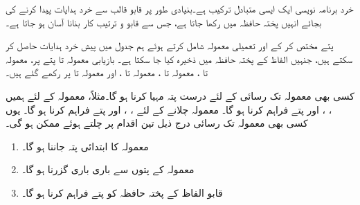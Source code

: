 خرد برنامہ نویسی ایک ایسی  متبادل ترکیب ہے۔بنیادی طور پر  قابو قالب سے خرد ہدایات پیدا کرنے کی بجائے انہیں پختہ حافظہ میں رکھا جاتا ہے، جس  سے  قابو و ترتیب کار بنانا   آسان ہو جاتا ہے۔

پتے مختص کر کے  اور تعمیلی معمولہ شامل کرتے ہوئے ہم جدول  میں پیش خرد ہدایات حاصل کر سکتے ہیں، جنہیں  الفاظ کے پختہ حافظہ میں ذخیرہ کیا جا سکتا ہے۔  بازیابی  معمولہ   تا  پتے پر،  معمولہ  تا ،  معمولہ  تا ،  معمولہ  تا ، اور    معمولہ  تا  پر رکھے گئے ہیں۔

کسی بھی معمولہ تک رسائی کے لئے  درست پتہ  مہیا کرنا ہو گا۔مثلاً،  معمولہ   کے لئے ہمیں ، ، اور  پتے فراہم کرنا ہو گا۔  معمولہ چلانے کے لئے ، ، اور  پتے فراہم کرنا ہو گا۔ یوں کسی بھی معمولہ تک رسائی درج ذیل تین اقدام پر چلتے ہوئے ممکن ہو گی۔
\begin{enumerate}[1.]
\item
معمولہ کا ابتدائی پتہ  جاننا ہو گا۔
\item
معمولہ کے پتوں سے  باری باری   گزرنا ہو گا۔
\item
 قابو الفاظ کے پختہ حافظہ کو پتے  فراہم کرنا ہو گا۔
\end{enumerate}


